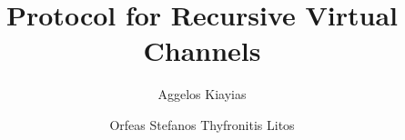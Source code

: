 \title{Protocol for Recursive Virtual Channels}
\author{Aggelos Kiayias \and Orfeas Stefanos Thyfronitis Litos}
%
\maketitle
